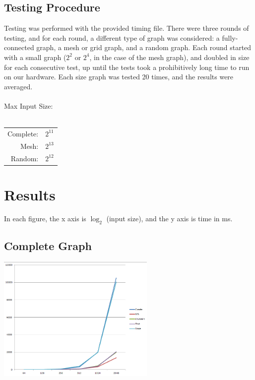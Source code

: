 \documentclass[titlepage]{article}
\newenvironment{Figure}
  {\par\medskip\noindent\minipage{\linewidth}}
  {\endminipage\par\medskip}
\begin{document}
\begin{multicols*}{2}
            \subsection{Testing Procedure}
                Testing was performed with the provided timing file. There were three rounds of testing, and for each round, a different type of graph was considered: a fully-connected graph, a mesh or grid graph, and a random graph. Each round started with a small graph ($2^2$ or $2^4$, in the case of the mesh graph), and doubled in size for each consecutive test, up until the tests took a prohibitively long time to run on our hardware. Each size graph was tested 20 times, and the results were averaged. \\ \\
                Max Input Size: \\ \\
                \begin{tabular}{r l}
                Complete:   & $2^{11}$ \\
                Mesh:       & $2^{13}$ \\
                Random:     & $2^{12}$ \\
                \end{tabular}
        \section{Results}
            In each figure, the x axis is $\log_2$ (input size), and the y axis is time in ms.
            \subsection{Complete Graph}
                \begin{Figure}
                    \centering
                    \includegraphics[width=3in]{complete}
                \end{Figure}


\end{multicols*}
\end{document}
